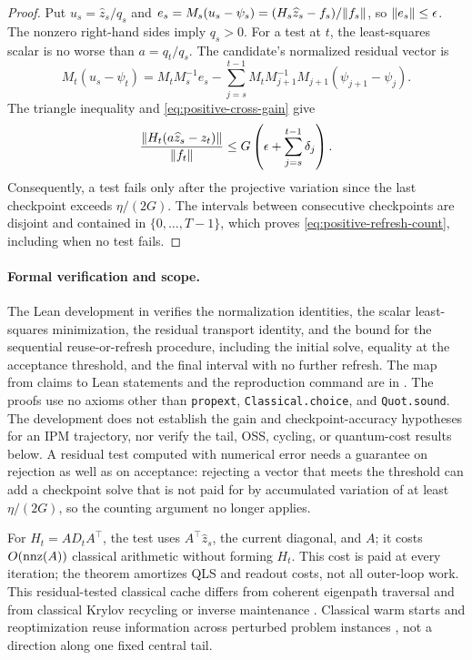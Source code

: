 \begin{proof}
Put $u_s=\widehat z_s/q_s$ and
$e_s=M_s(u_s-\psi_s)=(H_s\widehat z_s-f_s)/\lVert f_s\rVert$, so
$\lVert e_s\rVert\leq\epsilon$.  The nonzero right-hand sides imply $q_s>0$.
For a test at $t$, the least-squares scalar is no worse than $a=q_t/q_s$.
The candidate's normalized residual vector is
\[
 M_t(u_s-\psi_t)=M_tM_s^{-1}e_s-
 \sum_{j=s}^{t-1}M_tM_{j+1}^{-1}
       M_{j+1}(\psi_{j+1}-\psi_j).
\]
The triangle inequality and \eqref{eq:positive-cross-gain} give
\[
 \frac{\lVert H_t(a\widehat z_s-z_t)\rVert}{\lVert f_t\rVert}
 \leq G\left(\epsilon+\sum_{j=s}^{t-1}\delta_j\right).
\]
Consequently, a test fails only after the projective variation since the
last checkpoint exceeds $\eta/(2G)$.  The intervals between
consecutive checkpoints are disjoint and contained in $\{0,\ldots,T-1\}$, which proves
\eqref{eq:positive-refresh-count}, including when no test fails.
\end{proof}

\paragraph{Formal verification and scope.}
The Lean development in  verifies the
normalization identities, the scalar least-squares minimization, the residual
transport identity, and the bound for the sequential reuse-or-refresh
procedure, including the initial solve, equality at the acceptance threshold,
and the final interval with no further refresh.  The map from claims to Lean
statements and the reproduction command are in .  The
proofs use no axioms other than \texttt{propext}, \texttt{Classical.choice},
and \texttt{Quot.sound}.  The development does not establish the gain and
checkpoint-accuracy hypotheses for an IPM trajectory, nor verify the tail,
OSS, cycling, or quantum-cost results below.  A residual test computed with numerical error
needs a guarantee on rejection as well as on acceptance: rejecting a vector
that meets the threshold can add a checkpoint solve that is not paid for by
accumulated variation of at least $\eta/(2G)$, so the counting argument no
longer applies.

For $H_t=AD_tA^\top$, the test uses $A^\top\widehat z_s$, the current diagonal,
and $A$; it costs $O(\operatorname{nnz}(A))$ classical arithmetic without forming $H_t$.
This cost is paid at every iteration; the theorem amortizes QLS and readout
costs, not all outer-loop work.  This residual-tested classical cache differs
from coherent eigenpath traversal \cite{positive-boixo2010-eigenpath}
and from classical Krylov recycling or inverse maintenance
\cite{parks2006-recycling-krylov-subspaces-sequences-linear-systems,
lee2015-efficient-inverse-maintenance-and-faster}.
Classical warm starts and reoptimization reuse information across perturbed
problem instances
\cite{positive-yildirim2002-warm-start,
r4-n062-reoptimization-primal-dual-interior-point-method}, not a direction
along one fixed central tail.


